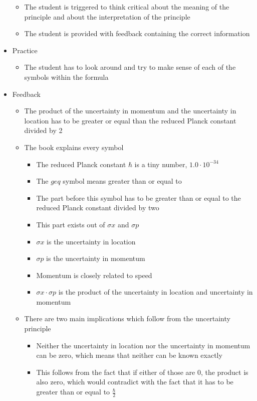 \documentclass[11pt,twoside]{report} %
\begin{document}
\begin{itemize}
\begin{itemize}
			\item The student is triggered to think critical about the meaning of the principle and about the interpretation of the principle
			\item The student is provided with feedback containing the correct information
		\end{itemize}
		\item Practice
		\begin{itemize}
			\item The student has to look around and try to make sense of each of the symbols within the formula
		\end{itemize}
		\item Feedback
		\begin{itemize}
			\item The product of the uncertainty in momentum and the uncertainty in location has to be greater or equal than the reduced Planck constant divided by 2
			\item The book explains every symbol
			\begin{itemize}
				\item The reduced Planck constant $\hbar$ is a tiny number, $1.0 \cdot 10^{-34}$
				\item The $geq$ symbol means greater than or equal to
				\item The part before this symbol has to be greater than or equal to the reduced Planck constant divided by two
				\item This part exists out of $\sigma x$ and $\sigma p$
				\item $\sigma x$ is the uncertainty in location
				\item $\sigma p$ is the uncertainty in momentum
				\item Momentum is closely related to speed
				\item $\sigma x \cdot \sigma p$ is the product of the uncertainty in location and uncertainty in momentum
			\end{itemize}
			\item There are two main implications which follow from the uncertainty principle
			\begin{itemize}
				\item Neither the uncertainty in location nor the uncertainty in momentum can be zero, which means that neither can be known exactly
				\item This follows from the fact that if either of those are 0, the product is also zero, which would contradict with the fact that it has to be greater than or equal to $\frac{\hbar}{2}$

\end{itemize}
\end{itemize}
\end{itemize}
\end{document}
